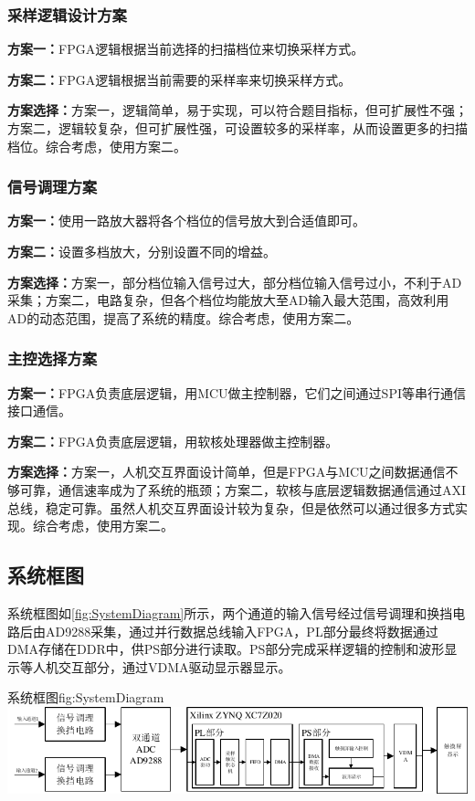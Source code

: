 \documentclass[supercite]{HustGraduPaper}
\begin{document}
	\subsubsection{采样逻辑设计方案}
	{\songti \bfseries 方案一：}FPGA逻辑根据当前选择的扫描档位来切换采样方式。
	
	{\songti \bfseries 方案二：}FPGA逻辑根据当前需要的采样率来切换采样方式。
	
	{\songti \bfseries 方案选择：}方案一，逻辑简单，易于实现，可以符合题目指标，但可扩展性不强；方案二，逻辑较复杂，但可扩展性强，可设置较多的采样率，从而设置更多的扫描档位。综合考虑，使用方案二。
	
	\subsubsection{信号调理方案}
	{\songti \bfseries 方案一：}使用一路放大器将各个档位的信号放大到合适值即可。
	
	{\songti \bfseries 方案二：}设置多档放大，分别设置不同的增益。
	
	{\songti \bfseries 方案选择：}方案一，部分档位输入信号过大，部分档位输入信号过小，不利于AD采集；方案二，电路复杂，但各个档位均能放大至AD输入最大范围，高效利用AD的动态范围，提高了系统的精度。综合考虑，使用方案二。
	
	\subsubsection{主控选择方案}
	{\songti \bfseries 方案一：}FPGA负责底层逻辑，用MCU做主控制器，它们之间通过SPI等串行通信接口通信。
	
	{\songti \bfseries 方案二：}FPGA负责底层逻辑，用软核处理器做主控制器。
	
	{\songti \bfseries 方案选择：}方案一，人机交互界面设计简单，但是FPGA与MCU之间数据通信不够可靠，通信速率成为了系统的瓶颈；方案二，软核与底层逻辑数据通信通过AXI总线，稳定可靠。虽然人机交互界面设计较为复杂，但是依然可以通过很多方式实现。综合考虑，使用方案二。
	
	\subsection{系统框图}
	系统框图如\autoref{fig:SystemDiagram}所示，两个通道的输入信号经过信号调理和换挡电路后由AD9288采集，通过并行数据总线输入FPGA，PL部分最终将数据通过DMA存储在DDR中，供PS部分进行读取。PS部分完成采样逻辑的控制和波形显示等人机交互部分，通过VDMA驱动显示器显示。
	\begin{generalfig}[htb]{系统框图}{fig:SystemDiagram}
		\includegraphics[width=\textwidth]{Figures/SystemDiagram.pdf}
	\end{generalfig}
	
\end{document}
